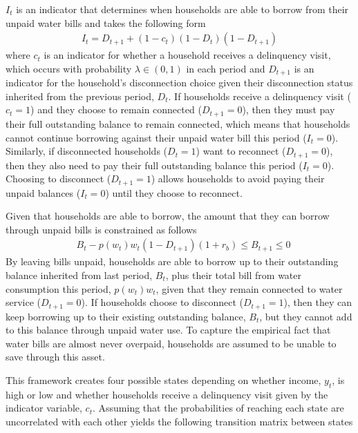 \documentclass[12pt]{article}
\begin{document}
$I_t$ is an indicator that determines when households are able to borrow from their unpaid water bills and takes the following form
\begin{align}
I_t = D_{t+1} + (1-c_t) (1-D_t) (1-D_{t+1})
\end{align} %
where $c_t$ is an indicator for whether a household receives a delinquency visit, which occurs with probability $\lambda \in (0,1)$ in each period and $D_{t+1}$ is an indicator for the household's disconnection choice given their disconnection status inherited from the previous period, $D_t$.  If households receive a delinquency visit ($c_t=1$) and they choose to remain connected ($D_{t+1}=0$), then they must pay their full outstanding balance to remain connected, which means that households cannot continue borrowing against their unpaid water bill this period ($I_t=0$).  Similarly, if disconnected households ($D_t=1$) want to reconnect ($D_{t+1}=0$), then they also need to pay their full outstanding balance this period ($I_t=0$).  Choosing to disconnect ($D_{t+1}=1$) allows households to avoid paying their unpaid balances ($I_t=0$) until they choose to reconnect.  

Given that households are able to borrow, the amount that they can borrow through unpaid bills is constrained as follows
\begin{align}\label{eq:borrowconstraint}
&B_t -  p(w_t) w_t (1-D_{t+1})(1+r_b) \leq B_{t+1} \leq 0 
\end{align}
By leaving bills unpaid, households are able to borrow up to their outstanding balance inherited from last period, $B_t$, plus their total bill from water consumption this period, $p(w_t) w_t$, given that they remain connected to water service ($D_{t+1}=0$).  If households choose to disconnect ($D_{t+1}=1$), then they can keep borrowing up to their existing outstanding balance, $B_t$, but they cannot add to this balance through unpaid water use.  To capture the empirical fact that water bills are almost never overpaid, households are assumed to be unable to save through this asset.

This framework creates four possible states depending on whether income, $y_t$, is high or low and whether households receive a delinquency visit given by the indicator variable, $c_t$.  Assuming that the probabilities of reaching each state are uncorrelated with each other yields the following transition matrix between states
\end{document}
